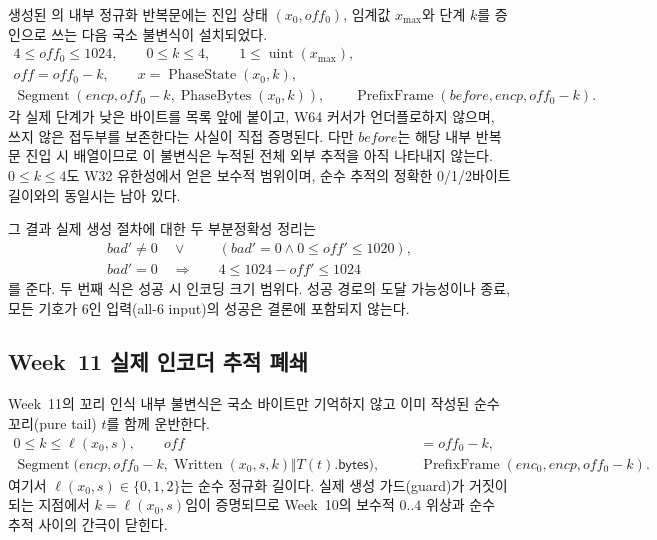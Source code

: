 생성된 의 내부 정규화 반복문에는 진입 상태
\((x_0,off_0)\), 임계값 \(x_{\max}\)와 단계 \(k\)를 증인으로 쓰는 다음 국소
불변식이 설치되었다.
\[
\begin{gathered}
  4\le off_0\le1024,\qquad 0\le k\le4,\qquad
  1\le\operatorname{uint}(x_{\max}),\\
  off=off_0-k,\qquad
  x=\operatorname{PhaseState}(x_0,k),\\
  \operatorname{Segment}
    (encp,off_0-k,\operatorname{PhaseBytes}(x_0,k)),\qquad
  \operatorname{PrefixFrame}(before,encp,off_0-k).
\end{gathered}
\]
각 실제  단계가 낮은 바이트를 목록 앞에 붙이고, W64 커서가
언더플로하지 않으며, 쓰지 않은 접두부를 보존한다는 사실이 직접 증명된다.
다만 \(before\)는 해당 내부 반복문 진입 시 배열이므로 이 불변식은 누적된 전체
외부 추적을 아직 나타내지 않는다. \(0\le k\le4\)도 W32 유한성에서 얻은 보수적
범위이며, 순수 추적의 정확한 0/1/2바이트 길이와의 동일시는 남아 있다.

그 결과 실제 생성 절차에 대한 두 부분정확성 정리는
\[
\begin{aligned}
 bad'\ne0\quad\lor\quad
   &(bad'=0\land 0\le off'\le1020),\\
 bad'=0\quad\Longrightarrow\quad
   &4\le1024-off'\le1024
\end{aligned}
\]
를 준다. 두 번째 식은 성공 시 인코딩 크기 범위다. 성공 경로의 도달 가능성이나
종료, 모든 기호가 6인 입력(all-6 input)의 성공은 결론에 포함되지 않는다.

\subsection{Week~11 실제 인코더 추적 폐쇄}

Week~11의 꼬리 인식 내부 불변식은 국소 바이트만 기억하지 않고 이미 작성된
순수 꼬리(pure tail) \(t\)를 함께 운반한다.
\[
\begin{aligned}
 0\le k\le\ell(x_0,s),\qquad
 off&=off_0-k,\\
 \operatorname{Segment}\bigl(encp,off_0-k,
   \operatorname{Written}(x_0,s,k)\Vert T(t).\mathsf{bytes}\bigr),\qquad
 &\operatorname{PrefixFrame}(enc_0,encp,off_0-k).
\end{aligned}
\]
여기서 \(\ell(x_0,s)\in\{0,1,2\}\)는 순수 정규화 길이다. 실제 생성
가드(guard)가 거짓이 되는 지점에서 \(k=\ell(x_0,s)\)임이 증명되므로 Week~10의 보수적
\(0..4\) 위상과 순수 추적 사이의 간극이 닫힌다.

